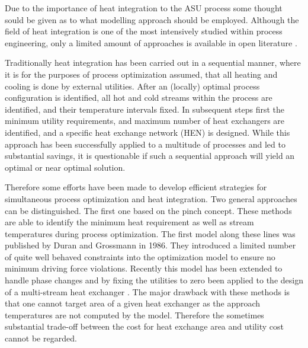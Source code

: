     Due to the importance of heat integration to the ASU process some thought sould be given as to what modelling approach
    should be employed. Although the field of heat integration is one of the most intensively studied within process engineering,
    only  a limited amount of approaches is available in open literature \cite{Kamath.2012}.

    Traditionally heat integration has been carried out in a sequential manner, where it is for the purposes of process
    optimization assumed, that all heating and cooling is done by external utilities. After an (locally) optimal
    process configuration is identified, all hot and cold streams within the process are identified, and their
    temperature intervals fixed. %
    In subsequent steps first the minimum utility requirements, and maximum number of heat exchangers are identified,
    and a specific heat exchange network (HEN) is designed. 
    While this approach has been successfully applied to a multitude of processes and led to substantial savings,
    it is questionable if such a sequential approach will yield an optimal or near optimal solution.

    Therefore some efforts have been made to develop efficient strategies for simultaneous process optimization
    and heat integration. Two general approaches can be distinguished. The first one based on the pinch concept.
     These methods are able to identify the minimum heat requirement
    as well as stream temperatures during process optimization. The first model along these lines was published
    by Duran and Grossmann \cite{Duran.1986} in 1986. They introduced a limited number of quite well behaved
    constraints into the optimization model to ensure no minimum driving force violations. Recently
    this model has been extended to handle phase changes and by fixing the utilities to zero been applied
    to the design of a multi-stream heat exchanger \cite{Kamath.2012}. The major drawback with these methods
    is that one cannot target area of a given heat exchanger as the approach temperatures are not computed
    by the model. Therefore the sometimes substantial trade-off between the cost for heat exchange area
    and utility cost cannot be regarded.

